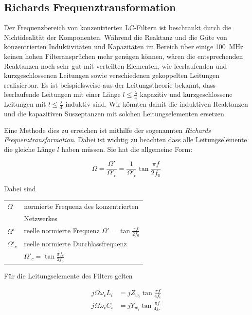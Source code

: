 \subsection{Richards Frequenztransformation}

Der  Frequenzbereich von konzentrierten LC-Filtern ist beschr\"ankt durch  die
Nichtidealit\"at der Komponenten.  W\"ahrend  die  Reaktanz und die G\"ute von
konzentrierten Induktivit\"aten und Kapazit\"aten  im  Bereich  \"uber  einige
\SI{100}{\mega\hertz} keinen hohen Filteranspr\"uchen mehr gen\"ugen k\"onnen,
w\"aren die entsprechenden Reaktanzen noch  sehr gut mit verteilten Elementen,
wie   leerlaufenden   und   kurzgeschlossenen  Leitungen  sowie  verschiedenen
gekoppelten   Leitungen  realisierbar.   Es   ist   beispielsweise   aus   der
Leitungstheorie  bekannt,  dass  leerlaufende  Leitungen   mit  einer  L\"ange
$l\le\frac{\lambda}{4}$   kapazitiv   und   kurzgeschlossene   Leitungen   mit
$l\le\frac{\lambda}{4}$  induktiv  sind.  Wir  k\"onnten damit die  induktiven
Reaktanzen und  die  kapazitiven  Suszeptanzen  mit  solchen Leitungselementen
ersetzen.

Eine Methode dies zu  erreichen  ist mithilfe der sogenannten \textit{Richards
Frequenztransformation}.   Dabei   ist   wichtig   zu   beachten   dass   alle
Leitungselemente  die  gleiche  L\"ange   $l$  haben  m\"ussen.  Sie  hat  die
allgemeine Form:

\begin{equation}
    \Omega = \frac{\Omega'}{\Omega'_c} = \frac{1}{\Omega'_c}\tan\frac{\pi f}{2f_0}
    \label{eq:richards}
\end{equation}

Dabei sind

\begin{tabular}{ll}
    $\Omega$    & normierte Frequenz des konzentrierten \\ 
                & Netzwerkes \\
    $\Omega'$   & reelle normierte Frequenz $\Omega' = \tan\frac{\pi f}{2f_0}$ \\
    $\Omega'_c$ & reelle normierte Durchlassfrequenz \\
                & $\Omega'_c = \tan\frac{\pi f_c}{2f_0}$ \\
\end{tabular}

F\"ur die Leitungselemente des Filters gelten

\begin{align}
    j\Omega\omega_cL_i &= jZ_{w_i}\tan\frac{\pi f}{4f_c} \\
    j\Omega\omega_cC_i &= jY_{w_i}\tan\frac{\pi f}{4f_c}
\end{align}

